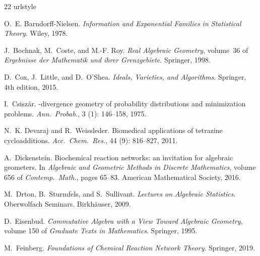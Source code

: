 \documentclass[preprint,12pt]{elsarticle}
\theoremstyle{definition}
\theoremstyle{remark}
\begin{document}
\begin{thebibliography}{22}
\providecommand{\natexlab}[1]{#1}
\providecommand{\url}[1]{\texttt{#1}}
\expandafter\ifx\csname urlstyle\endcsname\relax
  \providecommand{\doi}[1]{doi: #1}\else
  \providecommand{\doi}{doi: \begingroup \urlstyle{rm}\Url}\fi

O.~E. Barndorff-Nielsen.
\newblock \emph{Information and Exponential Families in Statistical Theory}.
\newblock Wiley, 1978.

J.~Bochnak, M.~Coste, and M.-F. Roy.
\newblock \emph{Real Algebraic Geometry}, volume~36 of \emph{Ergebnisse der
  Mathematik und ihrer Grenzgebiete}.
\newblock Springer, 1998.

D.~Cox, J.~Little, and D.~O'Shea.
\newblock \emph{Ideals, Varieties, and Algorithms}.
\newblock Springer, 4th edition, 2015.

I.~Csisz{\'a}r.
-divergence geometry of probability distributions and
  minimization problems.
\newblock \emph{Ann.\ Probab.}, 3 (1): 146--158, 1975.

N.~K. Devaraj and R.~Weissleder.
\newblock Biomedical applications of tetrazine cycloadditions.
\newblock \emph{Acc.\ Chem.\ Res.}, 44 (9): 816--827, 2011.

A.~Dickenstein.
\newblock Biochemical reaction networks: an invitation for algebraic geometers.
\newblock In \emph{Algebraic and Geometric Methods in Discrete Mathematics},
  volume 656 of \emph{Contemp.\ Math.}, pages 65--83. American Mathematical
  Society, 2016.

M.~Drton, B.~Sturmfels, and S.~Sullivant.
\newblock \emph{Lectures on Algebraic Statistics}.
\newblock Oberwolfach Seminars. Birkh\"auser, 2009.

D.~Eisenbud.
\newblock \emph{Commutative Algebra with a View Toward Algebraic Geometry},
  volume 150 of \emph{Graduate Texts in Mathematics}.
\newblock Springer, 1995.

M.~Feinberg.
\newblock \emph{Foundations of Chemical Reaction Network Theory}.
\newblock Springer, 2019.


\end{thebibliography}
\end{document}
